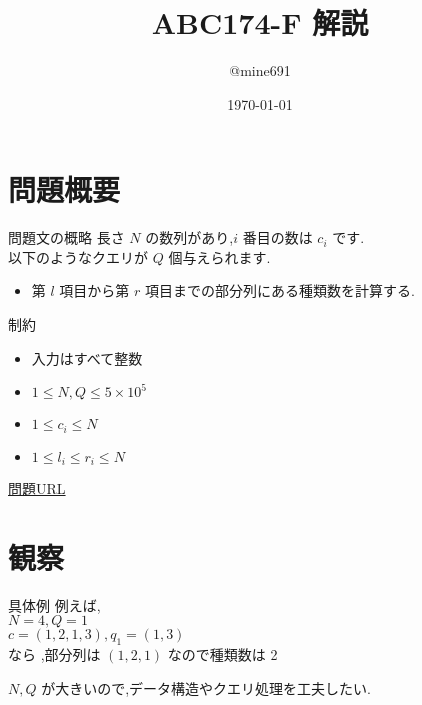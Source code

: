 \documentclass[dvipdfmx,12pt]{beamer}%
\title{ABC174-F 解説}
\author{@mine691}
\date{\today}
\begin{document}
\maketitle
%

\section{問題概要}
\begin{frame} %
\begin{block}{問題文の概略}
長さ $ N $ の数列があり,$ i $ 番目の数は $ c_i $ です.\\
以下のようなクエリが $ Q $ 個与えられます.\\
\begin{itemize}
	\item 第 $ l $ 項目から第 $ r $ 項目までの部分列にある種類数を計算する.
\end{itemize}
\end{block}

\begin{exampleblock}{制約}
	\begin{itemize}
		\item 入力はすべて整数
		\item $1 \leq N, Q \leq 5 \times 10 ^ {5}$
		\item \alert{$1 \leq c_i \leq N$}
		\item $1 \leq l_i \leq r_i \leq N $
	\end{itemize}
\end{exampleblock}
\href{https://atcoder.jp/contests/abc174/tasks/abc174_f}{問題URL}
\end{frame}

\section{観察}

\begin{frame}
\begin{exampleblock}{具体例}
	例えば,\\
	$ N = 4, Q = 1 $ \\
	$ c = (1,2,1,3), q_1 = (1,3) $ \\
	なら ,部分列は $ (1,2,1) $ なので種類数は 2 \\
\end{exampleblock}
$ N,Q $ が大きいので,データ構造やクエリ処理を工夫したい.

\end{frame}
\end{document}
